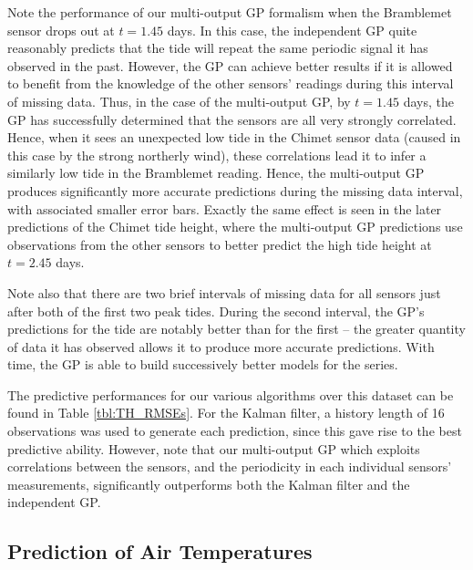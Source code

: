 \documentclass{acmtrans2m}
\begin{document}
Note the performance of our multi-output GP formalism when the Bramblemet sensor drops out at $t=1.45$ days.
In this case, the independent GP quite reasonably predicts that the tide will repeat the same periodic signal it has observed in the past. However, the GP can achieve better results if it is allowed to benefit from the knowledge of the other sensors' readings during this interval of missing data. Thus, in the case of the multi-output GP, by $t=1.45$ days, the GP has successfully determined that the sensors are all very strongly correlated. Hence, when it sees an unexpected low tide in the Chimet sensor data (caused in this case by the strong northerly wind), these correlations lead it to infer a similarly low tide in the Bramblemet reading. Hence, the multi-output GP produces significantly more accurate predictions during the missing data interval, with associated smaller error bars. Exactly the same effect is seen in the later predictions of the Chimet tide height, where the multi-output GP predictions use observations from the other sensors to better predict the high tide height at $t=2.45$ days. 

Note also that there are two brief intervals of missing data for all sensors just after both of the first two peak tides. During the second interval, the GP's predictions for the tide are notably better than for the first -- the greater quantity of data it has observed allows it to produce more accurate predictions. With time, the GP is able to build successively better models for the series.

The predictive performances for our various algorithms over this dataset can be found in Table \ref{tbl:TH_RMSEs}. For the Kalman filter, a history length of 16 observations was used to generate each prediction, since this gave rise to the best predictive ability. However, note that our multi-output GP which exploits correlations between the sensors, and the periodicity in each individual sensors' measurements, significantly outperforms both the Kalman filter and the independent GP.


\subsection{Prediction of Air Temperatures}
\end{document}
